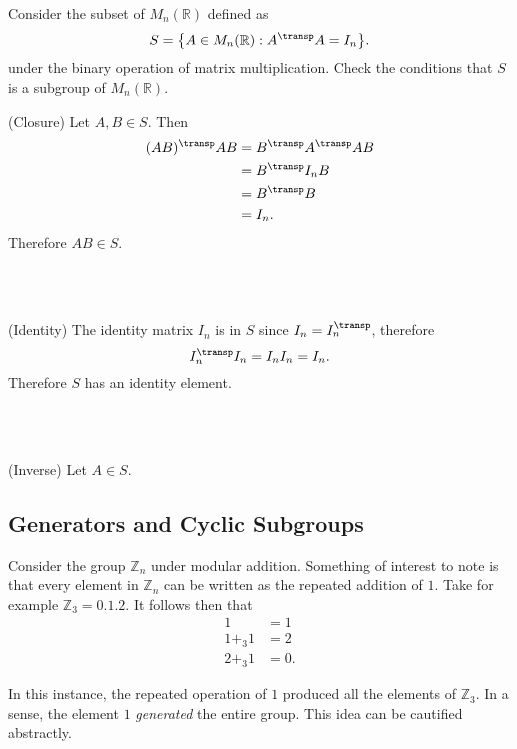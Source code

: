 \documentclass[../notes.tex]{subfiles}
\begin{document}
\begin{example}
	Consider the subset of $M_n(\mathbb{R})$ defined as
	\[
		S = \qty{A \in M_n (\mathbb{R}) : A^\transp A = I_n}
	.\]
	under the binary operation of matrix multiplication. Check the conditions that $S$ is a subgroup of $M_n (\mathbb{R})$. \\

	\quad\begin{minipage}{\dimexpr\textwidth-2cm}
		(Closure) \quad
		Let $A,B \in S$. Then
		\begin{align*}
			(AB)^\transp AB &= B^\transp A^\transp A B \\
											&= B^\transp I_n B \\
											&= B^\transp B \\
											&= I_n
		.\end{align*}
		Therefore $AB \in S$.
	\end{minipage} \\
	\\

	\quad\begin{minipage}{\dimexpr\textwidth-2cm}
		(Identity) \quad
		The identity matrix $I_n$ is in $S$ since $I_n = I_n^\transp$, therefore
		\[
			I_n^\transp I_n = I_n I_n = I_n
		.\]
		Therefore $S$ has an identity element.
	\end{minipage} \\
	\\

	\quad\begin{minipage}{\dimexpr\textwidth-2cm}
		(Inverse) \quad
		Let $A \in S$.
	\end{minipage}
\end{example}

\subsection{Generators and Cyclic Subgroups}

Consider the group $\mathbb{Z}_n$ under modular addition. Something of interest to note is that every element in $\mathbb{Z}_n$ can be written as the repeated addition of $1$. Take for example $\mathbb{Z}_3 = \qty{0,1,2}$. It follows then that
\begin{align*}
	1 & = 1 \\
	1 +_3 1 & = 2 \\
	2 +_3 1 & = 0
.\end{align*}

In this instance, the repeated operation of $1$ produced all the elements of $\mathbb{Z}_3$. In a sense, the element $1$ \textit{generated} the entire group. This idea can be cautified abstractly.
\end{document}
